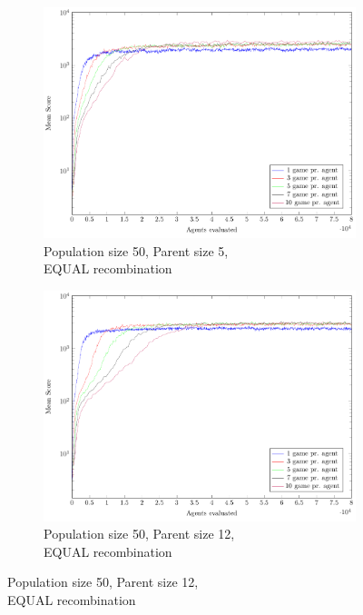 \begin{figure}
    \centering
    \captionsetup[subfigure]{justification=centering}
    \begin{subfigure}[b]{0.49\textwidth}
    	\centering
        \caption{Population size 50, Parent size 5,\\EQUAL recombination}
        \includegraphics[width=\textwidth]{data/cma_population_offspring/50x_split/equal_l50_o5/mean/PlotFile.pdf}
    \end{subfigure} 
    \begin{subfigure}[b]{0.49\textwidth}
    	\centering
    	\caption{Population size 50, Parent size 12,\\EQUAL recombination}
        \includegraphics[width=\textwidth]{data/cma_population_offspring/50x_split/equal_l50_o12/mean/PlotFile.pdf}

\end{subfigure}
\end{figure}
